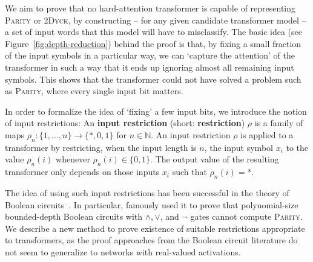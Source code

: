 \documentclass[11pt,a4paper]{article}
\newcommand{\key}[1]{\textbf{#1}}
\begin{document}
We aim to prove that no hard-attention transformer is capable of representing \textsc{Parity} or \textsc{2Dyck}, by constructing -- for any given candidate transformer model -- a set of input words that this model will have to misclassify.
The basic idea (see Figure~\ref{fig:depth-reduction}) behind the proof is that, by fixing a small fraction of the input symbols in a particular way, we can `capture the attention' of the transformer in such a way that it ends up ignoring almost all remaining input symbols.
This shows that the transformer could not have solved a problem such as \textsc{Parity}, where every single input bit matters.



In order to formalize the idea of `fixing'  a few input bits, we introduce the notion of input restrictions:
An \key{input restriction} (short: \key{restriction}) $\rho$ is a family of maps $\rho_n : \{1, \dots, n\} \rightarrow \{*, 0, 1\}$ for $n \in \mathbb{N}$.
An input restriction $\rho$ is applied to a transformer by restricting, when the input length is $n$, the input symbol $x_i$ to the value $\rho_n(i)$ whenever $\rho_n(i) \in \{0, 1\}$.
The output value of the resulting transformer only depends on those inputs $x_i$ such that $\rho_n(i) = *$.

The idea of using such input restrictions has been successful in the theory of Boolean circuits~\cite{furst1984parity,hastad1994optimal}.
In particular, \citet{furst1984parity}  famously used it to prove that polynomial-size bounded-depth Boolean circuits with $\wedge, \vee$, and $\neg$ gates cannot compute \textsc{Parity}.
We describe a new method to prove existence of suitable restrictions appropriate to transformers, as the proof approaches from the Boolean circuit literature do not seem to generalize to networks with real-valued activations.
\end{document}
